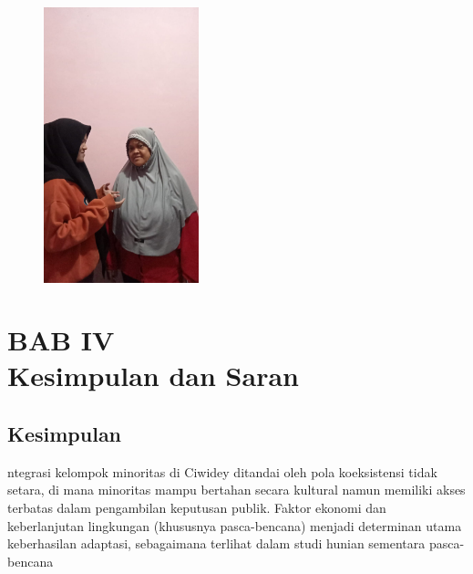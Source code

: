 \documentclass[a4paper,12pt, left=3cm,right=2cm,bottom=2cm, bahasa]{article}
\begin{document}
\begin{figure}[H]
  \begin{center}
    \includegraphics[width=0.4\textwidth]{images/gambar6.jpeg}
  \end{center}
\end{figure}


\setcounter{subsection}{0}
\setcounter{section}{5}
\section*{BAB IV \\ Kesimpulan dan Saran}
\subsection{Kesimpulan}
ntegrasi kelompok minoritas di Ciwidey ditandai oleh pola koeksistensi tidak setara, di mana minoritas mampu bertahan secara kultural namun memiliki akses terbatas dalam pengambilan keputusan publik. Faktor ekonomi dan keberlanjutan lingkungan (khususnya pasca-bencana) menjadi determinan utama keberhasilan adaptasi, sebagaimana terlihat dalam studi hunian sementara pasca-bencana \cite{Priyo:2012}
\end{document}
